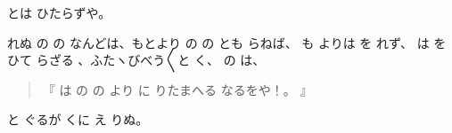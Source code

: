 とは
ひたらずや。

れぬ
の
の
なんどは、もとより
の
の
とも
らねば、
も
よりは
を
れず、
は
を
ひて
らざる
、ふたヽびべう〳〵と
く、
の
は、

\begin{quote}
『
は
の
の
より
に
りたまへる
なるをや！。
』
\end{quote}

と
ぐるが
くに
え
りぬ。

